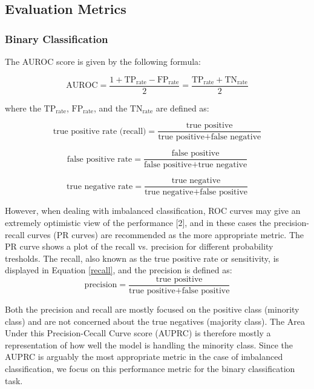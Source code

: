 \documentclass{article}
\begin{document}
\vspace{0.5cm}
\subsection{\large Evaluation Metrics}

\subsubsection*{\large Binary Classification}
The AUROC score is given by the following formula: 

\begin{equation} \text{AUROC} = \frac{1 + \text{TP}_\text{rate} - \text{FP}_\text{rate}}{2} = \frac{\text{TP}_\text{rate} + \text{TN}_\text{rate}}{2} 
\end{equation}

\noindent where the $\text{TP}_\text{rate}$, $\text{FP}_\text{rate}$, and the $\text{TN}_\text{rate}$ are defined as: 

\begin{equation}\label{recall}
\text{true positive rate (recall)} = \frac{\text{true positive}}{\text{true positive} + \text{false negative}} 
\end{equation} 

\begin{equation} \text{false positive rate} = \frac{\text{false positive}}{\text{false positive} + \text{true negative}} 
\end{equation}

\begin{equation} \text{true negative rate} = \frac{\text{true negative}}{\text{true negative} + \text{false positive}} 
\end{equation} 

\noindent However, when dealing with imbalanced classification, ROC curves may give an extremely optimistic view of the performance [2], and in these cases the precision-recall curves (PR curves) are recommended as the more appropriate metric. The PR curve shows a plot of the recall vs. precision for different probability tresholds. 
The recall, also known as the true positive rate or sensitivity, is displayed in Equation \ref{recall}, and the precision is defined as: 
\begin{equation}  
\text{precision} = \frac{\text{true positive}}{\text{true positive} + \text{false positive}}
\end{equation} 

\noindent Both the precision and recall are mostly focused on the positive class (minority class) and are not concerned about the true negatives (majority class). The Area Under this Precision-Cecall Curve score (AUPRC) is therefore mostly a representation of how well the model is handling the minority class. 
Since the AUPRC is arguably the most appropriate metric in the case of imbalanced classification, we focus on this performance metric for the binary classification task. 
\end{document}
